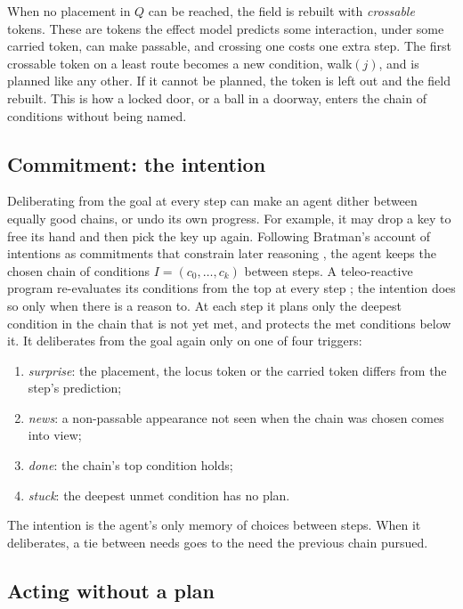 \documentclass{article}
\newcommand{\cond}[1]{\textsf{#1}}
\begin{document}
When no placement in $Q$ can be reached, the field is rebuilt with \emph{crossable} tokens. These are tokens the effect model predicts some interaction, under some carried token, can make passable, and crossing one costs one extra step. The first crossable token on a least route becomes a new condition, \cond{walk}$(j)$, and is planned like any other. If it cannot be planned, the token is left out and the field rebuilt. This is how a locked door, or a ball in a doorway, enters the chain of conditions without being named.

\subsection{Commitment: the intention}
\label{sec:intention}

Deliberating from the goal at every step can make an agent dither between equally good chains, or undo its own progress. For example, it may drop a key to free its hand and then pick the key up again. Following Bratman's account of intentions as commitments that constrain later reasoning \cite{Bratman1987,Kinny1991,Rao1995}, the agent keeps the chosen chain of conditions $I=(c_0,\dots,c_k)$ between steps. A teleo-reactive program re-evaluates its conditions from the top at every step \cite{Nilsson1994}; the intention does so only when there is a reason to. At each step it plans only the deepest condition in the chain that is not yet met, and protects the met conditions below it. It deliberates from the goal again only on one of four triggers:
\begin{enumerate}
    \item \emph{surprise}: the placement, the locus token or the carried token differs from the step's prediction;
    \item \emph{news}: a non-passable appearance not seen when the chain was chosen comes into view;
    \item \emph{done}: the chain's top condition holds;
    \item \emph{stuck}: the deepest unmet condition has no plan.
\end{enumerate}
The intention is the agent's only memory of choices between steps. When it deliberates, a tie between needs goes to the need the previous chain pursued.

\subsection{Acting without a plan}
\label{sec:noplan}
\end{document}
